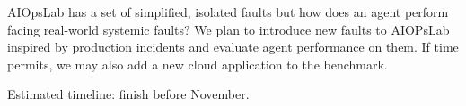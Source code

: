 \documentclass[conference]{IEEEtran}
\begin{document}
AIOpsLab has a set of simplified, isolated faults but how does an agent perform facing real-world systemic faults? We plan to introduce new faults to AIOPsLab inspired by production incidents and evaluate agent performance on them. If time permits, we may also add a new cloud application to the benchmark.

Estimated timeline: finish before November. 





\vspace{12pt}
\end{document}
